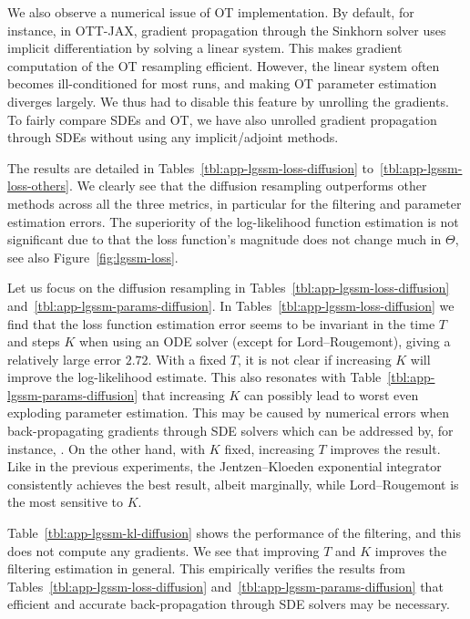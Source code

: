 \documentclass{article}
\begin{document}
We also observe a numerical issue of OT implementation. 
By default, for instance, in OTT-JAX, gradient propagation through the Sinkhorn solver uses implicit differentiation by solving a linear system. 
This makes gradient computation of the OT resampling efficient. 
However, the linear system often becomes ill-conditioned for most runs, and making OT parameter estimation diverges largely. 
We thus had to disable this feature by unrolling the gradients. 
To fairly compare SDEs and OT, we have also unrolled gradient propagation through SDEs without using any implicit/adjoint methods. 

The results are detailed in Tables~\ref{tbl:app-lgssm-loss-diffusion} to~\ref{tbl:app-lgssm-loss-others}.
We clearly see that the diffusion resampling outperforms other methods across all the three metrics, in particular for the filtering and parameter estimation errors. 
The superiority of the log-likelihood function estimation is not significant due to that the loss function's magnitude does not change much in $\Theta$, see also Figure~\ref{fig:lgssm-loss}. 

Let us focus on the diffusion resampling in Tables~\ref{tbl:app-lgssm-loss-diffusion} and~\ref{tbl:app-lgssm-params-diffusion}. 
In Tables~\ref{tbl:app-lgssm-loss-diffusion} we find that the loss function estimation error seems to be invariant in the time $T$ and steps $K$ when using an ODE solver (except for Lord--Rougemont), giving a relatively large error $2.72$. 
With a fixed $T$, it is not clear if increasing $K$ will improve the log-likelihood estimate. 
This also resonates with Table~\ref{tbl:app-lgssm-params-diffusion} that increasing $K$ can possibly lead to worst even exploding parameter estimation. 
This may be caused by numerical errors when back-propagating gradients through SDE solvers which can be addressed by, for instance, \citet{Kidger2021gradient}.
On the other hand, with $K$ fixed, increasing $T$ improves the result. 
Like in the previous experiments, the Jentzen--Kloeden exponential integrator consistently achieves the best result, albeit marginally, while Lord--Rougemont is the most sensitive to $K$. 

Table~\ref{tbl:app-lgssm-kl-diffusion} shows the performance of the filtering, and this does not compute any gradients.  
We see that improving $T$ and $K$ improves the filtering estimation in general. 
This empirically verifies the results from Tables~\ref{tbl:app-lgssm-loss-diffusion} and~\ref{tbl:app-lgssm-params-diffusion} that efficient and accurate back-propagation through SDE solvers may be necessary. 
\end{document}
